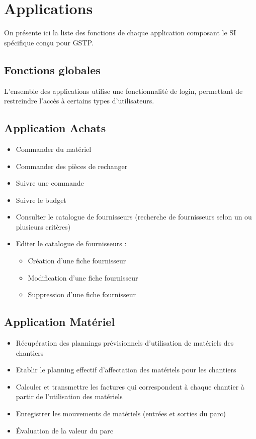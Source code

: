 \section{Applications}

On présente ici la liste des fonctions de chaque application composant le
SI spécifique conçu pour GSTP.


\subsection{Fonctions globales}

L'ensemble des applications utilise une fonctionnalité de login, permettant
de restreindre l'accès à certains types d'utilisateurs.


\subsection{Application Achats}

\begin{itemize}
\item Commander du matériel
\item Commander des pièces de rechanger
\item Suivre une commande
\item Suivre le budget
\item Consulter le catalogue de fournisseurs (recherche de fournisseurs selon 
un ou plusieurs critères)
\item Editer le catalogue de fournisseurs :
	\begin{itemize}
	\item Création d'une fiche fournisseur
	\item Modification d'une fiche fournisseur
	\item Suppression d'une fiche fournisseur
	\end{itemize}
\end{itemize}

\subsection{Application Matériel}
\begin{itemize}
\item Récupération des plannings prévisionnels d'utilisation de matériels
des chantiers
\item Etablir le planning effectif d'affectation des
matériels pour les chantiers
\item Calculer et transmettre les factures qui correspondent à chaque chantier
à partir de l'utilisation des matériels
\item Enregistrer les mouvements de matériels (entrées et sorties du parc)
\item Évaluation de la valeur du parc
\end{itemize}


